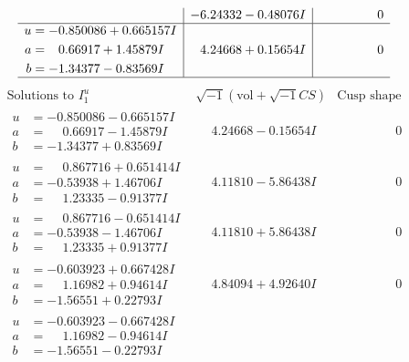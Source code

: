 \documentclass[1p]{elsarticle_modified}
\theoremstyle{definition}
\newcommand{\I}{\sqrt{-1}}
\begin{document}
$$\begin{array}{c|c|c}
 & -6.24332 - 0.48076 I & \phantom{-0.000000 } 0 \\ \hline\begin{aligned}
u &= -0.850086 + 0.665157 I \\
a &= \phantom{-}0.66917 + 1.45879 I \\
b &= -1.34377 - 0.83569 I\end{aligned}
 & \phantom{-}4.24668 + 0.15654 I & \phantom{-0.000000 } 0\\
 \hline 
 \end{array}$$\newpage$$\begin{array}{c|c|c}  
\text{Solutions to }I^u_{1}& \I (\text{vol} + \sqrt{-1}CS) & \text{Cusp shape}\\
 \hline 
\begin{aligned}
u &= -0.850086 - 0.665157 I \\
a &= \phantom{-}0.66917 - 1.45879 I \\
b &= -1.34377 + 0.83569 I\end{aligned}
 & \phantom{-}4.24668 - 0.15654 I & \phantom{-0.000000 } 0 \\ \hline\begin{aligned}
u &= \phantom{-}0.867716 + 0.651414 I \\
a &= -0.53938 + 1.46706 I \\
b &= \phantom{-}1.23335 - 0.91377 I\end{aligned}
 & \phantom{-}4.11810 - 5.86438 I & \phantom{-0.000000 } 0 \\ \hline\begin{aligned}
u &= \phantom{-}0.867716 - 0.651414 I \\
a &= -0.53938 - 1.46706 I \\
b &= \phantom{-}1.23335 + 0.91377 I\end{aligned}
 & \phantom{-}4.11810 + 5.86438 I & \phantom{-0.000000 } 0 \\ \hline\begin{aligned}
u &= -0.603923 + 0.667428 I \\
a &= \phantom{-}1.16982 + 0.94614 I \\
b &= -1.56551 + 0.22793 I\end{aligned}
 & \phantom{-}4.84094 + 4.92640 I & \phantom{-0.000000 } 0 \\ \hline\begin{aligned}
u &= -0.603923 - 0.667428 I \\
a &= \phantom{-}1.16982 - 0.94614 I \\
b &= -1.56551 - 0.22793 I\end{aligned}

\end{array}$$
\end{document}
